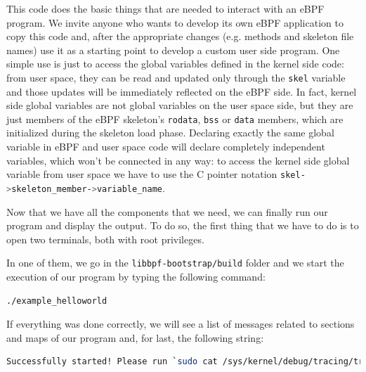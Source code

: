 This code does the basic things that are needed to interact with an eBPF program.
We invite anyone who wants to develop its own eBPF application to copy this code and, after the appropriate changes (e.g. methods and skeleton file names) use it as a starting point to develop a custom user side program.
One simple use is just to access the global variables defined in the kernel side code: from user space, they can be read and updated only through the \colorbox{backcolour}{\lstinline[style=commandline, language=bash, breaklines=true]|skel|} variable and those updates will be immediately reflected on the eBPF side. 
In fact, kernel side global variables are not global variables on the user space side, but they are just members of the eBPF skeleton’s \colorbox{backcolour}{\lstinline[style=commandline, language=bash, breaklines=true]|rodata|}, \colorbox{backcolour}{\lstinline[style=commandline, language=bash, breaklines=true]|bss|} or \colorbox{backcolour}{\lstinline[style=commandline, language=bash, breaklines=true]|data|} members, which are initialized during the skeleton load phase. 
Declaring exactly the same global variable in eBPF and user space code will declare completely independent variables, which won’t be connected in any way: to access the kernel side global variable from user space we have to use the C pointer notation \colorbox{backcolour}{\lstinline[style=commandline, language=bash, breaklines=true]|skel->skeleton_member->variable_name|}.

Now that we have all the components that we need, we can finally run our program and display the output.
To do so, the first thing that we have to do is to open two terminals, both with root privileges.

In one of them, we go in the \colorbox{backcolour}{\lstinline[style=commandline, language=bash, breaklines=true]|libbpf-bootstrap/build|} folder and we start the execution of our program by typing the following command:

\begin{lstlisting}[style=commandline, language=bash, caption={libbpf-bootstrap program's execution command.}]
	./example_helloworld
\end{lstlisting}

If everything was done correctly, we will see a list of messages related to sections and maps of our program and, for last, the following string:

\begin{lstlisting}[style=commandline, language=bash, caption={Program's successful execution message in libbpf-bootstrap.}]
	Successfully started! Please run `sudo cat /sys/kernel/debug/tracing/trace_pipe` to see output of the BPF programs.
\end{lstlisting}

